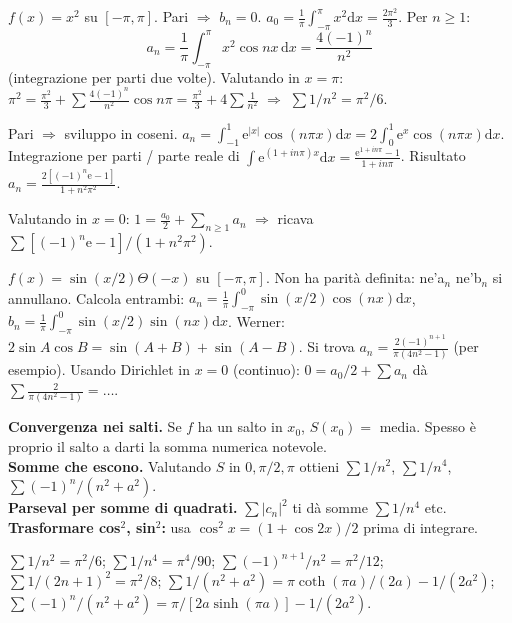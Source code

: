 \documentclass[11pt,a4paper,openany]{book}
\theoremstyle{definition}
\newcommand{\dd}{\mathrm{d}}
\newcommand{\eu}{\mathrm{e}}
\begin{document}
\begin{esempio}[Scritto 15/01/2024, Es. 4]
$f(x)=x^2$ su $[-\pi,\pi]$. Pari $\Rightarrow$ $b_n=0$. $a_0=\frac{1}{\pi}\int_{-\pi}^\pi x^2\dd x=\frac{2\pi^2}{3}$. Per $n\ge 1$:
$$a_n=\frac{1}{\pi}\int_{-\pi}^\pi x^2\cos nx\,\dd x=\frac{4(-1)^n}{n^2}$$
(integrazione per parti due volte). Valutando in $x=\pi$: $\pi^2=\frac{\pi^2}{3}+\sum\frac{4(-1)^n}{n^2}\cos n\pi=\frac{\pi^2}{3}+4\sum\frac{1}{n^2}$ $\Rightarrow$ $\sum 1/n^2=\pi^2/6$.
\end{esempio}

\begin{esempio}[{Scritto 03/07/2024, Es. 3 -- $\eu^{|x|}$ su $[-1,1]$}]
Pari $\Rightarrow$ sviluppo in coseni. $a_n=\int_{-1}^1\eu^{|x|}\cos(n\pi x)\dd x=2\int_0^1\eu^x\cos(n\pi x)\dd x$. Integrazione per parti / parte reale di $\int\eu^{(1+in\pi)x}\dd x=\frac{\eu^{1+in\pi}-1}{1+in\pi}$. Risultato $a_n=\frac{2[(-1)^n\eu-1]}{1+n^2\pi^2}$.

Valutando in $x=0$: $1=\frac{a_0}{2}+\sum_{n\ge 1}a_n$ $\Rightarrow$ ricava $\sum[(-1)^n\eu-1]/(1+n^2\pi^2)$.
\end{esempio}

\begin{esempio}[Scritto 05/05/2025, Es. 3]
$f(x)=\sin(x/2)\Theta(-x)$ su $[-\pi,\pi]$. Non ha parit\`a definita: ne'a$_n$ ne'b$_n$ si annullano. Calcola entrambi: $a_n=\frac{1}{\pi}\int_{-\pi}^0\sin(x/2)\cos(nx)\dd x$, $b_n=\frac{1}{\pi}\int_{-\pi}^0\sin(x/2)\sin(nx)\dd x$. Werner: $2\sin A\cos B=\sin(A+B)+\sin(A-B)$. Si trova $a_n=\frac{2(-1)^{n+1}}{\pi(4n^2-1)}$ (per esempio). Usando Dirichlet in $x=0$ (continuo): $0=a_0/2+\sum a_n$ d\`a $\sum\frac{2}{\pi(4n^2-1)}=\dots$.
\end{esempio}

\begin{trucco}
\textbf{Convergenza nei salti.} Se $f$ ha un salto in $x_0$, $S(x_0)=$ media. Spesso \`e proprio il salto a darti la somma numerica notevole.\\
\textbf{Somme che escono.} Valutando $S$ in $0,\pi/2,\pi$ ottieni $\sum 1/n^2$, $\sum 1/n^4$, $\sum(-1)^n/(n^2+a^2)$.\\
\textbf{Parseval per somme di quadrati.} $\sum|c_n|^2$ ti d\`a somme $\sum 1/n^4$ etc.\\
\textbf{Trasformare cos$^2$, sin$^2$:} usa $\cos^2 x=(1+\cos 2x)/2$ prima di integrare.
\end{trucco}

\begin{formulario}
$\sum 1/n^2=\pi^2/6$; $\sum 1/n^4=\pi^4/90$; $\sum (-1)^{n+1}/n^2=\pi^2/12$; $\sum 1/(2n+1)^2=\pi^2/8$; $\sum 1/(n^2+a^2)=\pi\coth(\pi a)/(2a)-1/(2a^2)$; $\sum(-1)^n/(n^2+a^2)=\pi/[2a\sinh(\pi a)]-1/(2a^2)$.
\end{formulario}
\end{document}
